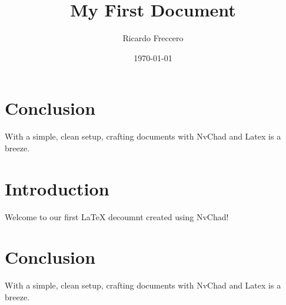 \section{Conclusion}
With a simple, clean setup, crafting documents with NvChad and Latex is a breeze.




\title{My First Document}
\author{Ricardo Freccero}

\date{\today}
\maketitle

\section{Introduction}
Welcome to our first LaTeX decoumnt created using NvChad!

\section{Conclusion}
With a simple, clean setup, crafting documents with NvChad and Latex is a breeze.


